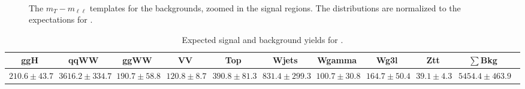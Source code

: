 \begin{figure}[!hbtp]
{}
\\

\caption{The $m_T-m_{\ell\ell}$ templates for the backgrounds, zoomed in 
the signal regions. The distributions are 
normalized to the expectations for \intlumiEightTeV.}
\label{fig:mtvsmll_bkg}
\end{figure}

\begin{table}[!hbtp]
{%
 \tiny
 \begin{center}
 \begin{tabular}{| c | c c c c c c c c c  | c}
 \hline
 ggH & qqWW & ggWW & VV & Top & Wjets & Wgamma & Wg3l & Ztt & $\sum$Bkg \\
 \hline
$210.6\pm43.7$ & $3616.2\pm334.7$ & $190.7\pm58.8$ & $120.8\pm8.7$ & $390.8\pm81.3$ & $831.4\pm299.3$ & $100.7\pm30.8$ & $164.7\pm50.4$ & $39.1\pm4.3$ & $5454.4\pm463.9$ \\ 
\hline
\end{tabular}
\end{center}
}
\caption{Expected signal and background yields for \intlumiEightTeV.}
\label{tab:yield}
\end{table}
